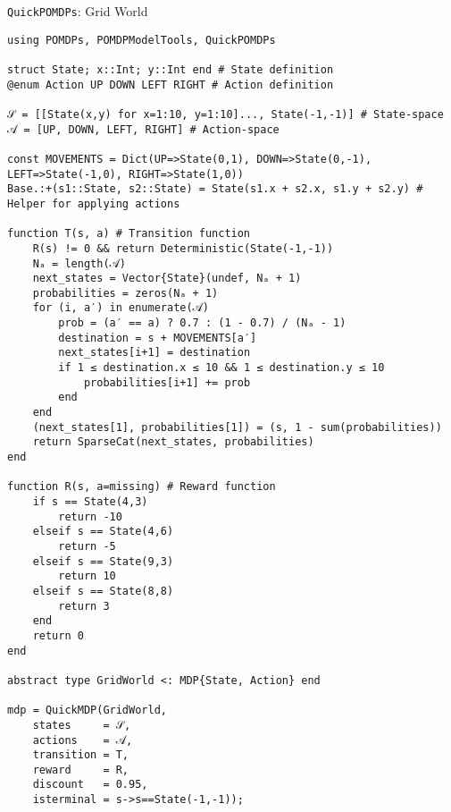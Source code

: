 
\begin{frame}[fragile]{\texttt{QuickPOMDPs}: Grid World}

\begin{lrbox}{\gridworldcode}%
\begin{lstlisting}[language=JuliaLocal, style=julia]
using POMDPs, POMDPModelTools, QuickPOMDPs

struct State; x::Int; y::Int end # State definition
@enum Action UP DOWN LEFT RIGHT # Action definition

𝒮 = [[State(x,y) for x=1:10, y=1:10]..., State(-1,-1)] # State-space
𝒜 = [UP, DOWN, LEFT, RIGHT] # Action-space

const MOVEMENTS = Dict(UP=>State(0,1), DOWN=>State(0,-1), LEFT=>State(-1,0), RIGHT=>State(1,0))
Base.:+(s1::State, s2::State) = State(s1.x + s2.x, s1.y + s2.y) # Helper for applying actions

function T(s, a) # Transition function
    R(s) != 0 && return Deterministic(State(-1,-1))
    Nₐ = length(𝒜)
    next_states = Vector{State}(undef, Nₐ + 1)
    probabilities = zeros(Nₐ + 1)
    for (i, a′) in enumerate(𝒜)
        prob = (a′ == a) ? 0.7 : (1 - 0.7) / (Nₐ - 1)
        destination = s + MOVEMENTS[a′]
        next_states[i+1] = destination
        if 1 ≤ destination.x ≤ 10 && 1 ≤ destination.y ≤ 10
            probabilities[i+1] += prob
        end
    end    
    (next_states[1], probabilities[1]) = (s, 1 - sum(probabilities))
    return SparseCat(next_states, probabilities)
end

function R(s, a=missing) # Reward function
    if s == State(4,3)
        return -10
    elseif s == State(4,6)
        return -5
    elseif s == State(9,3)
        return 10
    elseif s == State(8,8)
        return 3
    end
    return 0
end

abstract type GridWorld <: MDP{State, Action} end

mdp = QuickMDP(GridWorld,
    states     = 𝒮,
    actions    = 𝒜,
    transition = T,
    reward     = R,
    discount   = 0.95,
    isterminal = s->s==State(-1,-1));
\end{lstlisting}
\end{lrbox}%




\end{frame}
